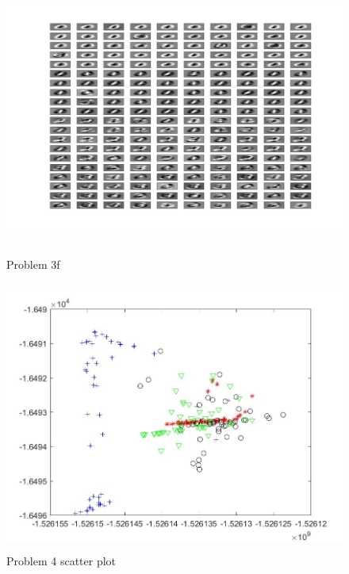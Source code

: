 \documentclass[11pt]{scrartcl}
\begin{document}
\begin{figure} 

	\includegraphics[width=5.5in,height=3.5in]{digit_image_3f.jpg}
	\caption{Problem 3f}
\end{figure}
\begin{figure} 

	\includegraphics[width=5.5in,height=3.5in]{digit_image_4.jpg}
	\caption{Problem 4 scatter plot}
\end{figure}
\end{document}
